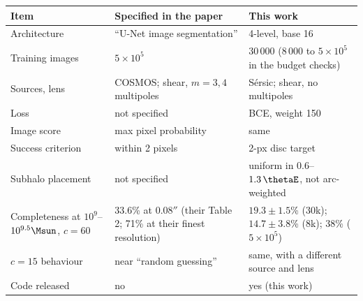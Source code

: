 \begin{tabular}{@{}p{2.35cm}p{2.55cm}p{2.3cm}@{}}
\toprule
Item & Specified in the paper & This work \\
\midrule
Architecture & ``U-Net image segmentation'' & 4-level, base 16 \\
Training images & $5\times10^5$ & 30\,000 (8\,000 to $5\times10^5$ in the budget checks) \\
Sources, lens & COSMOS; shear, $m=3,4$ multipoles & S\'ersic; shear, no multipoles \\
Loss & not specified & BCE, weight 150 \\
Image score & max pixel probability & same \\
Success criterion & within 2 pixels & 2-px disc target \\
Subhalo placement & not specified & uniform in $0.6$--$1.3\,\thetaE$, not arc-weighted \\
Completeness at $10^{9}$--$10^{9.5}\Msun$, $c=60$ & 33.6\% at $0.08''$ (their Table 2; 71\% at their finest resolution) & $19.3\pm1.5$\% (30k); $14.7\pm3.8$\% (8k); 38\% ($5\times10^5$) \\
$c=15$ behaviour & near ``random guessing'' & same, with a different source and lens \\
Code released & no & yes (this work) \\
\bottomrule
\end{tabular}
